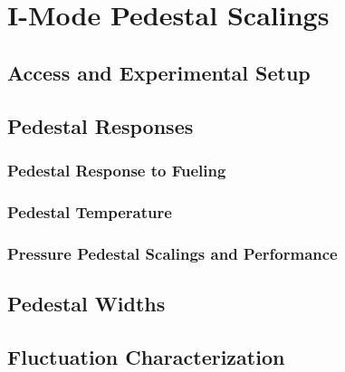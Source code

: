 \chapter{I-Mode Pedestal Scalings}\label{ch:ImodePedestal}

\section{Access and Experimental Setup}\label{sec:imode_setup}

\nicesectionending

\section{Pedestal Responses}\label{sec:imode_height}

\subsection{Pedestal Response to Fueling}\label{subsec:imode_fueling}

\subsection{Pedestal Temperature}\label{subsec:imode_temp}

\subsection{Pressure Pedestal Scalings and Performance}\label{subsec:imode_pres}

\nicesectionending

\section{Pedestal Widths}\label{sec:imode_width}

\nicesectionending

\section{Fluctuation Characterization}\label{sec:imode_fluct}

\nicechapterending


